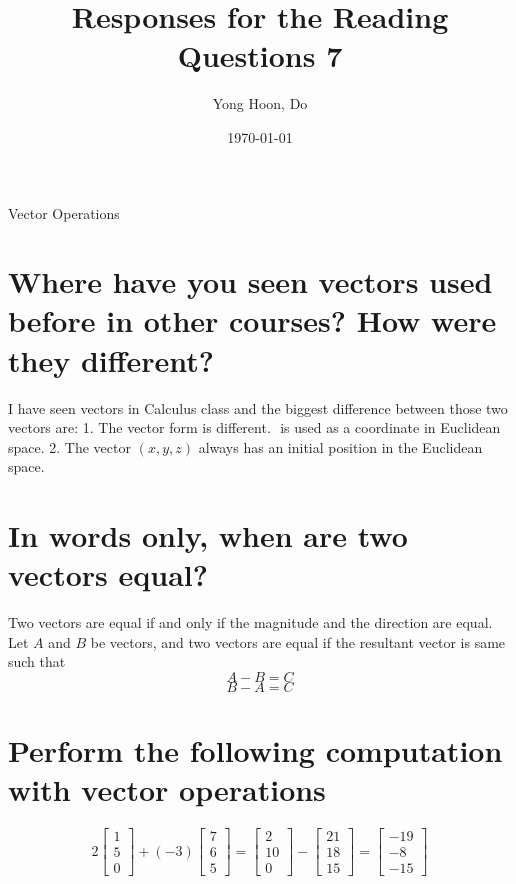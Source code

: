 \documentclass{article}
\title{Responses for the Reading Questions 7}
\author{Yong Hoon, Do}
\date{\today}
\begin{document}
\maketitle

\begin{center}
Vector Operations
\end{center}

\section{Where have you seen vectors used before in other courses? How were they different?}
I have seen vectors in Calculus class and the biggest difference between those two vectors are:
1. The vector form is different. \(<x,y,z>\) is used as a coordinate in Euclidean space.
2. The vector \((x,y,z)\) always has an initial position in the Euclidean space.

\section{In words only, when are two vectors equal?}
Two vectors are equal if and only if the magnitude and the direction are equal.
Let \(A\) and \(B\) be vectors, and two vectors are equal if the resultant vector is same such that
\begin{equation}
  A-B=C
\end{equation}
\begin{equation}
  B-A=C
\end{equation}

\section{Perform the following computation with vector operations}

\[
  2
    \begin{bmatrix}
      1 \\
      5 \\
      0
    \end{bmatrix}
  +
  (-3)
  \begin{bmatrix}
    7 \\
    6 \\
    5
  \end{bmatrix}
  =
  \begin{bmatrix}
    2 \\
    10 \\
    0
  \end{bmatrix}
  -
  \begin{bmatrix}
    21 \\
    18 \\
    15
  \end{bmatrix}
  =
  \begin{bmatrix}
    -19 \\
    -8 \\
    -15
  \end{bmatrix}
\]
\end{document}
